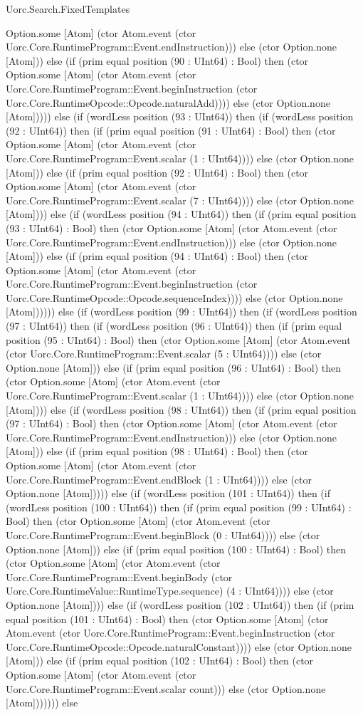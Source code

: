 \begin{lexlean}{Uorc.Search.FixedTemplates}
\begin{semanticmodule}
{Option.some [Atom] (ctor Atom.event (ctor Uorc.Core.RuntimeProgram::Event.endInstruction))) else (ctor Option.none [Atom])) else (if (prim equal position (90 : UInt64) : Bool) then (ctor Option.some [Atom] (ctor Atom.event (ctor Uorc.Core.RuntimeProgram::Event.beginInstruction (ctor Uorc.Core.RuntimeOpcode::Opcode.naturalAdd)))) else (ctor Option.none [Atom])))) else (if (wordLess position (93 : UInt64)) then (if (wordLess position (92 : UInt64)) then (if (prim equal position (91 : UInt64) : Bool) then (ctor Option.some [Atom] (ctor Atom.event (ctor Uorc.Core.RuntimeProgram::Event.scalar (1 : UInt64)))) else (ctor Option.none [Atom])) else (if (prim equal position (92 : UInt64) : Bool) then (ctor Option.some [Atom] (ctor Atom.event (ctor Uorc.Core.RuntimeProgram::Event.scalar (7 : UInt64)))) else (ctor Option.none [Atom]))) else (if (wordLess position (94 : UInt64)) then (if (prim equal position (93 : UInt64) : Bool) then (ctor Option.some [Atom] (ctor Atom.event (ctor Uorc.Core.RuntimeProgram::Event.endInstruction))) else (ctor Option.none [Atom])) else (if (prim equal position (94 : UInt64) : Bool) then (ctor Option.some [Atom] (ctor Atom.event (ctor Uorc.Core.RuntimeProgram::Event.beginInstruction (ctor Uorc.Core.RuntimeOpcode::Opcode.sequenceIndex)))) else (ctor Option.none [Atom]))))) else (if (wordLess position (99 : UInt64)) then (if (wordLess position (97 : UInt64)) then (if (wordLess position (96 : UInt64)) then (if (prim equal position (95 : UInt64) : Bool) then (ctor Option.some [Atom] (ctor Atom.event (ctor Uorc.Core.RuntimeProgram::Event.scalar (5 : UInt64)))) else (ctor Option.none [Atom])) else (if (prim equal position (96 : UInt64) : Bool) then (ctor Option.some [Atom] (ctor Atom.event (ctor Uorc.Core.RuntimeProgram::Event.scalar (1 : UInt64)))) else (ctor Option.none [Atom]))) else (if (wordLess position (98 : UInt64)) then (if (prim equal position (97 : UInt64) : Bool) then (ctor Option.some [Atom] (ctor Atom.event (ctor Uorc.Core.RuntimeProgram::Event.endInstruction))) else (ctor Option.none [Atom])) else (if (prim equal position (98 : UInt64) : Bool) then (ctor Option.some [Atom] (ctor Atom.event (ctor Uorc.Core.RuntimeProgram::Event.endBlock (1 : UInt64)))) else (ctor Option.none [Atom])))) else (if (wordLess position (101 : UInt64)) then (if (wordLess position (100 : UInt64)) then (if (prim equal position (99 : UInt64) : Bool) then (ctor Option.some [Atom] (ctor Atom.event (ctor Uorc.Core.RuntimeProgram::Event.beginBlock (0 : UInt64)))) else (ctor Option.none [Atom])) else (if (prim equal position (100 : UInt64) : Bool) then (ctor Option.some [Atom] (ctor Atom.event (ctor Uorc.Core.RuntimeProgram::Event.beginBody (ctor Uorc.Core.RuntimeValue::RuntimeType.sequence) (4 : UInt64)))) else (ctor Option.none [Atom]))) else (if (wordLess position (102 : UInt64)) then (if (prim equal position (101 : UInt64) : Bool) then (ctor Option.some [Atom] (ctor Atom.event (ctor Uorc.Core.RuntimeProgram::Event.beginInstruction (ctor Uorc.Core.RuntimeOpcode::Opcode.naturalConstant)))) else (ctor Option.none [Atom])) else (if (prim equal position (102 : UInt64) : Bool) then (ctor Option.some [Atom] (ctor Atom.event (ctor Uorc.Core.RuntimeProgram::Event.scalar count))) else (ctor Option.none [Atom])))))) else }
\end{semanticmodule}
\end{lexlean}
